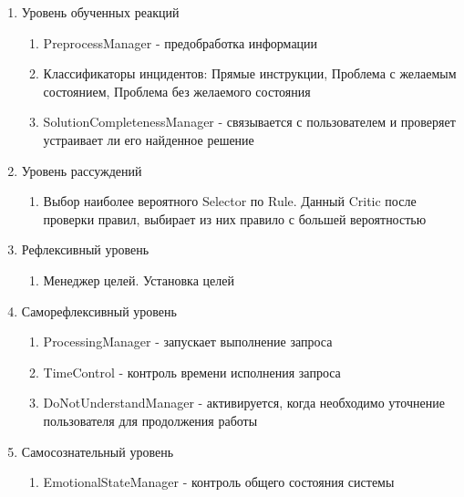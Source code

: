 \begin{enumerate}
	\item Уровень обученных реакций
	\begin{enumerate}
		\item PreprocessManager - предобработка информации
		\item Классификаторы инцидентов: Прямые инструкции, Проблема с желаемым состоянием, Проблема без желаемого состояния
		\item SolutionCompletenessManager - связывается с пользователем и проверяет устраивает ли его найденное решение
	\end{enumerate}
	\item Уровень рассуждений
	\begin{enumerate}
		\item Выбор наиболее вероятного Selector по Rule. Данный Critic после проверки правил, выбирает из них правило с большей вероятностью
	\end{enumerate}
	\item Рефлексивный уровень
	\begin{enumerate}
		\item Менеджер целей. Установка целей
	\end{enumerate}
	\item Саморефлексивный уровень
	\begin{enumerate}
		\item ProcessingManager - запускает выполнение запроса
		\item TimeControl - контроль времени исполнения запроса
		\item DoNotUnderstandManager - активируется, когда необходимо уточнение пользователя для продолжения работы
	\end{enumerate}
	\item Самосознательный уровень
	\begin{enumerate}
		\item EmotionalStateManager - контроль общего состояния системы
	\end{enumerate} 
\end{enumerate}
\clearpage
